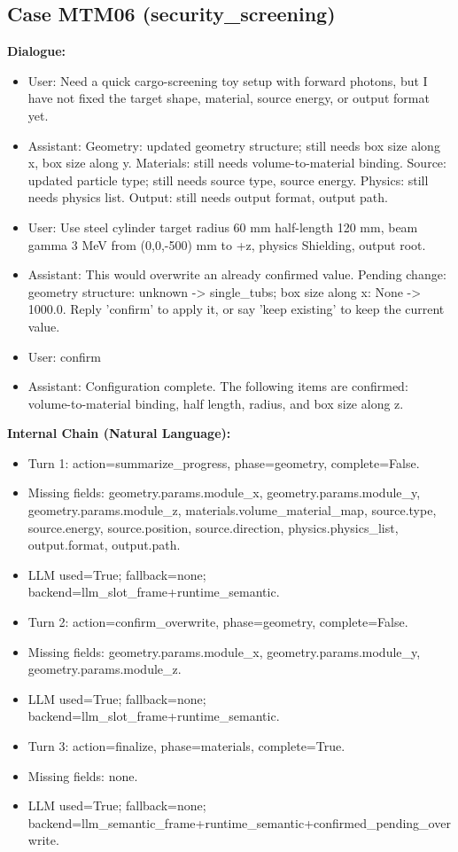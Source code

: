 \documentclass[11pt]{ctexart}
\begin{document}
\subsection{Case MTM06 (security\_screening)}
\textbf{Dialogue:}
\begin{itemize}
\item User: Need a quick cargo-screening toy setup with forward photons, but I have not fixed the target shape, material, source energy, or output format yet.
\item Assistant: Geometry: updated geometry structure; still needs box size along x, box size along y. Materials: still needs volume-to-material binding. Source: updated particle type; still needs source type, source energy. Physics: still needs physics list. Output: still needs output format, output path.
\item User: Use steel cylinder target radius 60 mm half-length 120 mm, beam gamma 3 MeV from (0,0,-500) mm to +z, physics Shielding, output root.
\item Assistant: This would overwrite an already confirmed value. Pending change: geometry structure: unknown -> single\_tubs; box size along x: None -> 1000.0. Reply 'confirm' to apply it, or say 'keep existing' to keep the current value.
\item User: confirm
\item Assistant: Configuration complete. The following items are confirmed: volume-to-material binding, half length, radius, and box size along z.
\end{itemize}
\textbf{Internal Chain (Natural Language):}
\begin{itemize}
\item Turn 1: action=summarize\_progress, phase=geometry, complete=False.
\item Missing fields: geometry.params.module\_x, geometry.params.module\_y, geometry.params.module\_z, materials.volume\_material\_map, source.type, source.energy, source.position, source.direction, physics.physics\_list, output.format, output.path.
\item LLM used=True; fallback=none; backend=llm\_slot\_frame+runtime\_semantic.
\item Turn 2: action=confirm\_overwrite, phase=geometry, complete=False.
\item Missing fields: geometry.params.module\_x, geometry.params.module\_y, geometry.params.module\_z.
\item LLM used=True; fallback=none; backend=llm\_slot\_frame+runtime\_semantic.
\item Turn 3: action=finalize, phase=materials, complete=True.
\item Missing fields: none.
\item LLM used=True; fallback=none; backend=llm\_semantic\_frame+runtime\_semantic+confirmed\_pending\_overwrite.
\end{itemize}
\end{document}

